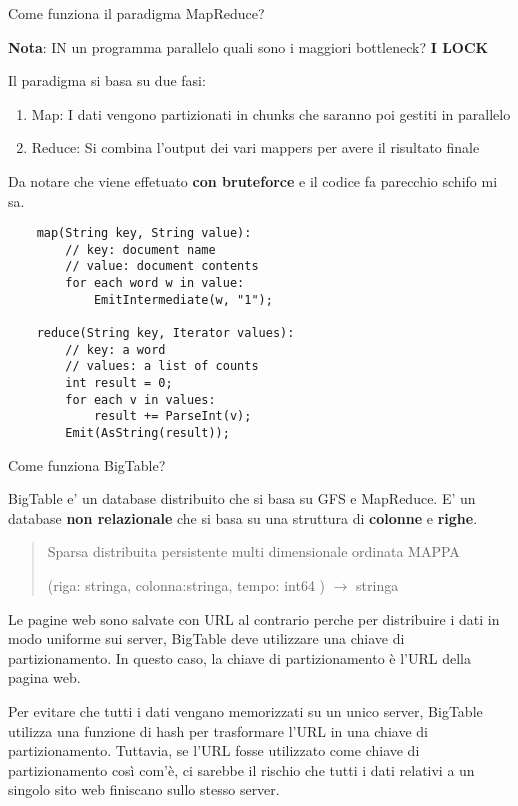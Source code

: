 \begin{domanda}
    Come funziona il paradigma MapReduce?
\end{domanda}

\textbf{Nota}: IN un programma parallelo quali sono i maggiori bottleneck? \textbf{I LOCK}

Il paradigma si basa su due fasi:
\begin{enumerate}
    \item Map: I dati vengono partizionati in chunks che saranno poi gestiti in parallelo \item Reduce: Si combina l'output dei vari mappers per avere il risultato finale
\end{enumerate}

Da notare che viene effetuato \textbf{con bruteforce} e il codice fa parecchio
schifo mi sa.

\begin{lstlisting}
    map(String key, String value):
        // key: document name
        // value: document contents
        for each word w in value:
            EmitIntermediate(w, "1");

    reduce(String key, Iterator values):
        // key: a word
        // values: a list of counts
        int result = 0;
        for each v in values:
            result += ParseInt(v);
        Emit(AsString(result));
\end{lstlisting}

\begin{domanda}
    Come funziona BigTable?
\end{domanda}

BigTable e' un database distribuito che si basa su GFS e MapReduce. E' un
database \textbf{non relazionale} che si basa su una struttura di
\textbf{colonne} e \textbf{righe}.

\begin{quote}
    Sparsa distribuita persistente multi dimensionale ordinata MAPPA

    (riga: stringa, colonna:stringa, tempo: int64 ) $\rightarrow$ stringa
\end{quote}

Le pagine web sono salvate con URL al contrario perche per distribuire i dati
in modo uniforme sui server, BigTable deve utilizzare una chiave di
partizionamento. In questo caso, la chiave di partizionamento è l'URL della
pagina web.

Per evitare che tutti i dati vengano memorizzati su un unico server, BigTable
utilizza una funzione di hash per trasformare l'URL in una chiave di
partizionamento. Tuttavia, se l'URL fosse utilizzato come chiave di
partizionamento così com'è, ci sarebbe il rischio che tutti i dati relativi a
un singolo sito web finiscano sullo stesso server.

